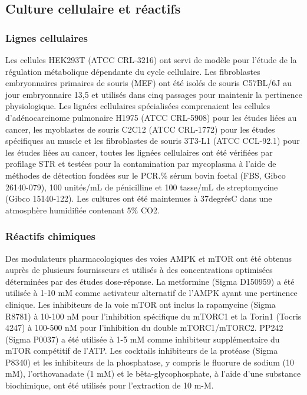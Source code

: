 \documentclass[11pt,a4paper]{article}
\begin{document}
\subsection{Culture cellulaire et réactifs}

\subsubsection{Lignes cellulaires}

Les cellules HEK293T (ATCC CRL-3216) ont servi de modèle pour l'étude de la régulation métabolique dépendante du cycle cellulaire. Les fibroblastes embryonnaires primaires de souris (MEF) ont été isolés de souris C57BL/6J au jour embryonnaire 13,5 et utilisés dans cinq passages pour maintenir la pertinence physiologique. Les lignées cellulaires spécialisées comprenaient les cellules d'adénocarcinome pulmonaire H1975 (ATCC CRL-5908) pour les études liées au cancer, les myoblastes de souris C2C12 (ATCC CRL-1772) pour les études spécifiques au muscle et les fibroblastes de souris 3T3-L1 (ATCC CCL-92.1) pour les études liées au cancer, toutes les lignées cellulaires ont été vérifiées par profilage STR et testées pour la contamination par mycoplasma à l'aide de méthodes de détection fondées sur le PCR.\% sérum bovin foetal (FBS, Gibco 26140-079), 100 unités/mL de pénicilline et 100 tasse/mL de streptomycine (Gibco 15140-122). Les cultures ont été maintenues à 37degrésC dans une atmosphère humidifiée contenant 5\% CO2.

\subsubsection{Réactifs chimiques}

Des modulateurs pharmacologiques des voies AMPK et mTOR ont été obtenus auprès de plusieurs fournisseurs et utilisés à des concentrations optimisées déterminées par des études dose-réponse. La metformine (Sigma D150959) a été utilisée à 1-10 mM comme activateur alternatif de l'AMPK ayant une pertinence clinique. Les inhibiteurs de la voie mTOR ont inclus la rapamycine (Sigma R8781) à 10-100 nM pour l'inhibition spécifique du mTORC1 et la Torin1 (Tocris 4247) à 100-500 nM pour l'inhibition du double mTORC1/mTORC2. PP242 (Sigma P0037) a été utilisée à 1-5 mM comme inhibiteur supplémentaire du mTOR compétitif de l'ATP. Les cocktails inhibiteurs de la protéase (Sigma P8340) et les inhibiteurs de la phosphatase, y compris le fluorure de sodium (10 mM), l'orthovanadate (1 mM) et le bêta-glycophosphate, à l'aide d'une substance biochimique, ont été utilisés pour l'extraction de 10 m-M.
\end{document}
